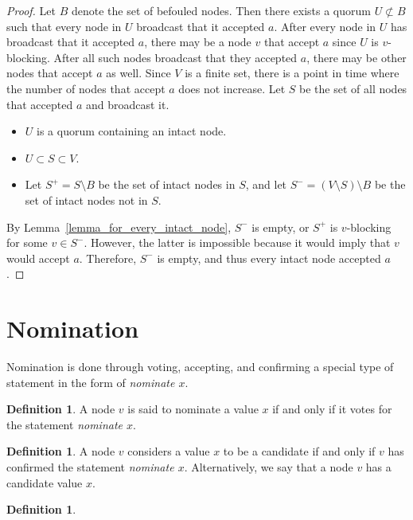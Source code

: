 \documentclass[12pt, psamsfonts]{amsart}
\theoremstyle{definition}
\newtheorem{defn}[thm]{Definition}
\theoremstyle{remark}
\numberwithin{equation}{section}
\begin{document}
\begin{proof}
    Let $B$ denote the set of befouled nodes.
    Then there exists a quorum $U \not\subset B$ such that every node in $U$ broadcast that it accepted $a$.
    After every node in $U$ has broadcast that it accepted $a$, there may be a node $v$ that accept $a$ since $U$ is $v$-blocking.
    After all such nodes broadcast that they accepted $a$, there may be other nodes that accept $a$ as well.
    Since $V$ is a finite set, there is a point in time where the number of nodes that accept $a$ does not increase.
    Let $S$ be the set of all nodes that accepted $a$ and broadcast it.
    \begin{itemize}
        \item
            $U$ is a quorum containing an intact node.
        \item
            $U \subset S \subset V$.
        \item
            Let $S^{+} = S \setminus B$ be the set of intact nodes in $S$, and let $S^{-} = (V \setminus S) \setminus B$ be the set of intact nodes not in $S$.
    \end{itemize}
    By Lemma~\ref{lemma_for_every_intact_node}, $S^{-}$ is empty, or $S^{+}$ is $v$-blocking for some $v \in S^{-}$.
    However, the latter is impossible because it would imply that $v$ would accept $a$.
    Therefore, $S^{-}$ is empty, and thus every intact node accepted $a$.
\end{proof}

\section{Nomination}

Nomination is done through voting, accepting, and confirming a special type of statement in the form of \textit{nominate $x$}.

\begin{defn}
    A node $v$ is said to nominate a value $x$ if and only if it votes for the statement \textit{nominate $x$}.
\end{defn}

\begin{defn}
    A node $v$ considers a value $x$ to be a candidate if and only if $v$ has confirmed the statement \textit{nominate $x$}.
    Alternatively, we say that a node $v$ has a candidate value $x$.
\end{defn}

\begin{defn}
\end{defn}
\end{document}
